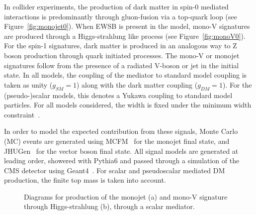 In collider experiments, the production of dark matter in spin-0 mediated interactions is predominantly through gluon-fusion via a top-quark loop (see Figure~\ref{fig:monojet0}). 
When EWSB is present in the model, mono-V signatures are produced through a Higgs-strahlung like 
process (see Figure~\ref{fig:monoV0}). For the spin-1 signatures, dark matter is produced in an analogous way to Z boson production through quark initiated processes. The mono-V or monojet signatures follow 
from the presence of a radiated V-boson or jet in the initial state. In all models, the coupling of the mediator to standard model coupling is taken as unity 
($g_{SM}=1$) along with 
the dark matter coupling ($g_{DM}=1$). For the (pseudo-)scalar models, this denotes a Yukawa coupling to standard model particles. For all models considered, 
the width is fixed under the minimum width constraint~\cite{Harris:2014hga}.

In order to model the expected contribution from these signals, Monte Carlo (MC) events are generated using MCFM~\cite{mcfm}
for the monojet final state, and JHUGen~\cite{Anderson:2013afp} 
for the vector boson final state. All signal models are 
generated at leading order, showered with Pythia6 and passed through a 
simulation of the CMS detector using Geant4~\cite{geant4}. 
For scalar and pseudoscalar mediated DM production, the finite top mass is 
taken into account. 

\begin{figure}[htbp]
  \centering
  \caption{Diagrams for production of the monojet (a) and mono-V signature through Higgs-strahlung (b), through a scalar mediator.\label{fig:monoXfeyn}}
\end{figure}



